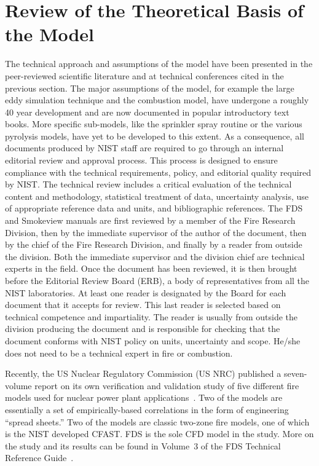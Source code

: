 \documentclass[11pt]{book}
\begin{document}
\section{Review of the Theoretical Basis of the Model}

\label{JustAA} The technical approach and assumptions of the model have been presented in the peer-reviewed scientific literature and at technical
conferences cited in the previous section. The major assumptions of the model, for example the large eddy simulation technique and the combustion
model, have undergone a roughly 40 year development and are now documented in popular introductory text books. More specific sub-models, like the
sprinkler spray routine or the various pyrolysis models, have yet to be developed to this extent. As a consequence, all documents produced by NIST
staff are required to go through an internal editorial review and approval process. This process is designed to ensure compliance with the technical
requirements, policy, and editorial quality required by NIST. The technical review includes a critical evaluation of the technical content and
methodology, statistical treatment of data, uncertainty analysis, use of appropriate reference data and units, and bibliographic references. The FDS
and Smokeview manuals are first reviewed by a member of the Fire Research Division, then by the immediate supervisor of the author of the document,
then by the chief of the Fire Research Division, and finally by a reader from outside the division. Both the immediate supervisor and the division
chief are technical experts in the field. Once the document has been reviewed, it is then brought before the Editorial Review Board (ERB), a body of
representatives from all the NIST laboratories. At least one reader is designated by the Board for each document that it accepts for review. This
last reader is selected based on technical competence and impartiality. The reader is usually from outside the division producing the document and is
responsible for checking that the document conforms with NIST policy on units, uncertainty and scope. He/she does not need to be a technical expert
in fire or combustion.

Recently, the US Nuclear Regulatory Commission (US NRC) published a seven-volume report on its own verification and validation study of five
different fire models used for nuclear power plant applications~\cite{NUREG_1824}. Two of the models are essentially a set of empirically-based
correlations in the form of engineering ``spread sheets.'' Two of the models are classic two-zone fire models, one of which is the NIST developed
CFAST. FDS is the sole CFD model in the study. More on the study and its results can be found in Volume~3 of the FDS Technical Reference
Guide~\cite{FDS_Tech_Guide}.
\end{document}
